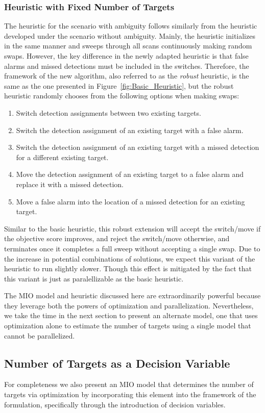 \subsubsection{Heuristic with Fixed Number of Targets}
The heuristic for the scenario with ambiguity follows similarly from the heuristic developed under the scenario without ambiguity. Mainly, the heuristic initializes in the same manner and sweeps through all scans continuously making random swaps. However, the key difference in the newly adapted heuristic is that false alarms and missed detections must be included in the switches. Therefore, the framework of the new algorithm, also referred to as the \textit{robust} heuristic, is the same as the one presented in Figure~\ref{fig:Basic_Heuristic}, but the robust heuristic randomly chooses from the following options when making swaps: 
\begin{enumerate}
  \item Switch detection assignments between two existing targets.
  \item Switch the detection assignment of an existing target with a false alarm.
  \item Switch the detection assignment of an existing target with a missed detection for a different existing target.
  \item Move the detection assignment of an existing target to a false alarm and replace it with a missed detection.
  \item Move a false alarm into the location of a missed detection for an existing target.
\end{enumerate}

Similar to the basic heuristic, this robust extension will accept the switch/move if the objective score improves, and reject the switch/move otherwise, and terminates once it completes a full sweep without accepting a single swap. Due to the increase in potential combinations of solutions, we expect this variant of the heuristic to run slightly slower. Though this effect is mitigated by the fact that this variant is just as paralellizable as the basic heuristic. 

The MIO model and heuristic discussed here are extraordinarily powerful because they leverage both the powers of optimization and parallelization. Nevertheless, we take the time in the next section to present an alternate model, one that uses optimization alone to estimate the number of targets using a single model that cannot be parallelized. 

\subsection{Number of Targets as a Decision Variable}
For completeness we also present an MIO model that determines the number of targets via optimization by incorporating this element into the framework of the formulation, specifically through the introduction of decision variables. 

